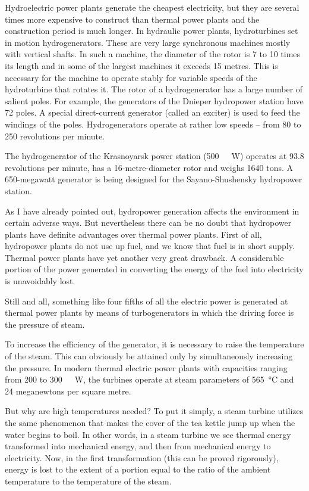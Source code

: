 Hydroelectric power plants generate the cheapest elec­tricity, but they are several times more expensive to con­struct than thermal power plants and the construction period is much longer. In hydraulic power plants, hydro­turbines set in motion hydrogenerators. These are very large synchronous machines mostly with vertical shafts. In such a machine, the diameter of the rotor is 7 to 10 times its length and in some of the largest machines it exceeds 15 metres. This is necessary for the machine to operate stably for variable speeds of the hydroturbine that rotates it. The rotor of a hydrogenerator has a large number of salient poles. For example, the generators of the Dnieper hydropower station have 72 poles. A special direct-current generator (called an exciter) is used to feed the windings of the poles. Hydrogenerators operate at rather low speeds -- from 80 to 250 revolutions per minute.

The hydrogenerator of the Krasnoyarsk power station (\SI{500}{\mega­\watt}) operates at 93.8 revolutions per minute, has a 16-metre-diameter rotor and weighs 1640 tons. A 650-megawatt generator is being designed for the Sayano-Shushensky hydropower station.

As I have already pointed out, hydropower generation affects the environment in certain adverse ways. But nevertheless there can be no doubt that hydropower plants have definite advantages over thermal power plants. First of all, hydropower plants do not use up fuel, and we know that fuel is in short supply. Thermal power plants have yet another very great drawback. A considerable portion of the power generated in converting the energy of the fuel into electricity is unavoidably lost.

Still and all, something like four fifths of all the elec­tric power is generated at thermal power plants by means of turbogenerators in which the driving force is the pres­sure of steam.

To increase the efficiency of the generator, it is nec­essary to raise the temperature of the steam. This can obviously be attained only by simultaneously increasing the pressure. In modern thermal electric power plants with capacities ranging from 200 to \SI{300}{\mega­\watt}, the turbines operate at steam parameters of \SI{565}{\celsius} and 24 meganewtons per square metre.

But why are high temperatures needed? To put it sim­ply, a steam turbine utilizes the same phenomenon that makes the cover of the tea kettle jump up when the water begins to boil. In other words, in a steam turbine we see thermal energy transformed into mechanical energy, and then from mechanical energy to electricity. Now, in the first transformation (this can be proved rigorously), energy is lost to the extent of a portion equal to the ratio of the ambient temperature to the temperature of the steam.


